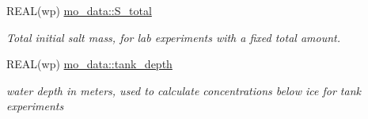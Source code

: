 \begin{DoxyCompactItemize}
REAL(wp) \hyperlink{namespacemo__data_a48908c6562a2cb9ef6b51897c4c27716}{mo\_\-data::S\_\-total}
\begin{DoxyCompactList}\small\item\em Total initial salt mass, for lab experiments with a fixed total amount. \item\end{DoxyCompactList}\item 
REAL(wp) \hyperlink{namespacemo__data_aa2b42f87a9dc571898326286dfab4350}{mo\_\-data::tank\_\-depth}
\begin{DoxyCompactList}\small\item\em water depth in meters, used to calculate concentrations below ice for tank experiments \item\end{DoxyCompactList}\end{DoxyCompactItemize}
